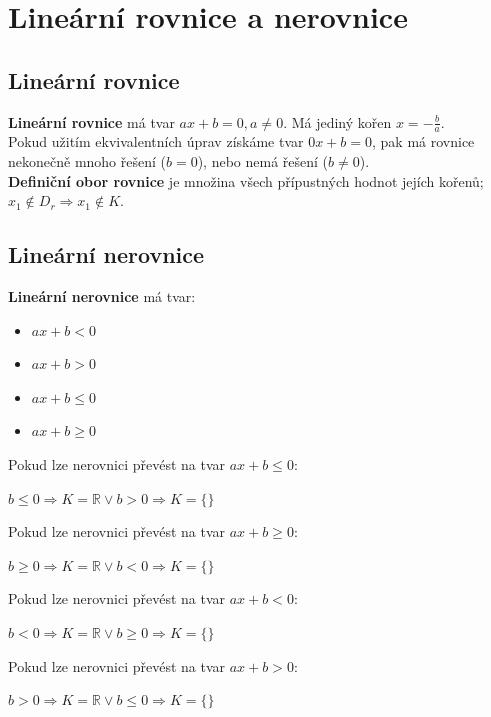 \documentclass[12pt, a4paper]{article}
\newcommand{\imply}{\Rightarrow}
\begin{document}
\section{Lineární rovnice a nerovnice}

\subsection*{Lineární rovnice}
\textbf{Lineární rovnice} má tvar $ax+b=0, a \neq 0$. Má jediný kořen $x=-\frac{b}{a}$.\\
Pokud užitím ekvivalentních úprav získáme tvar $0x+b=0$, pak má rovnice nekonečně mnoho řešení ($b=0$), nebo nemá řešení ($b \neq 0$).\\
\textbf{Definiční obor rovnice} je množina všech přípustných hodnot jejích kořenů; $x_1 \notin D_r \imply x_1 \notin K$.\\

\subsection*{Lineární nerovnice}
\textbf{Lineární nerovnice} má tvar: 
\begin{itemize}
\item $ax + b < 0$
\item $ax + b > 0$
\item $ax + b \leq 0$
\item $ax + b \geq 0$
\end{itemize}
Pokud lze nerovnici převést na tvar $ax + b \leq 0$:
\begin{center}
$b \leq 0 \imply K = \mathbb{R} \lor b > 0 \imply K = \{\}$
\end{center}
Pokud lze nerovnici převést na tvar $ax + b \geq 0$:
\begin{center}
$b \geq 0 \imply K = \mathbb{R} \lor b < 0 \imply K = \{\}$
\end{center}
Pokud lze nerovnici převést na tvar $ax + b < 0$:
\begin{center}
$b < 0 \imply K = \mathbb{R} \lor b \geq 0 \imply K = \{\}$
\end{center}
Pokud lze nerovnici převést na tvar $ax + b > 0$:
\begin{center}
$b > 0 \imply K = \mathbb{R} \lor b \leq 0 \imply K = \{\}$
\end{center}
\pagebreak
\end{document}
